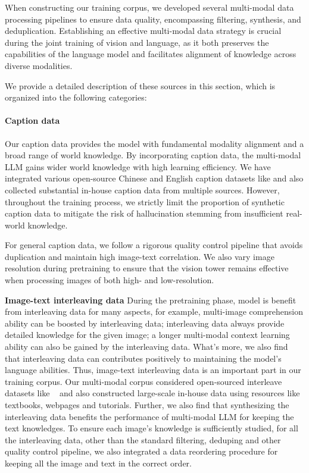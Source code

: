 \documentclass{article}
\newcommand{\citep}[1]{\parencite{#1}}
\begin{document}
When constructing our training corpus, we developed several multi-modal data processing pipelines to ensure data quality, encompassing filtering, synthesis, and deduplication. 
Establishing an effective multi-modal data strategy is crucial during the joint training of vision and language, as it both preserves the capabilities of the language model and facilitates alignment of knowledge across diverse modalities.

We provide a detailed description of these sources in this section, which is organized into the following categories:

\paragraph{Caption data}
Our caption data provides the model with fundamental modality alignment and a broad range of world knowledge. By incorporating caption data, the multi-modal LLM gains wider world knowledge with high learning efficiency. We have integrated various open-source Chinese and English caption datasets like \citep{schuhmann2022laion, gadre2024datacomp} and also collected substantial in-house caption data from multiple sources. However, throughout the training process, we strictly limit the proportion of synthetic caption data to mitigate the risk of hallucination stemming from insufficient real-world knowledge.

For general caption data, we follow a rigorous quality control pipeline that avoids duplication and maintain high image-text correlation. We also vary image resolution during pretraining to ensure that the vision tower remains effective when processing images of both high- and low-resolution.

\textbf{Image-text interleaving data}
During the pretraining phase, model is benefit from interleaving data for many aspects, for example, multi-image comprehension ability can be boosted by interleaving data; interleaving data always provide detailed knowledge for the given image; a longer multi-modal context learning ability can also be gained by the interleaving data. What's more, we also find that interleaving data can contributes positively to maintaining the model’s language abilities. 
Thus, image-text interleaving data is an important part in our training corpus. 
Our multi-modal corpus considered open-sourced interleave datasets like ~\citep{zhu2024multimodal,laurenccon2024obelics} and also constructed large-scale in-house data using resources like textbooks, webpages and tutorials.
Further, we also find that synthesizing the interleaving data benefits the performance of multi-modal LLM for keeping the text knowledges.  
To ensure each image's knowledge is sufficiently studied, for all the interleaving data, other than the standard filtering, deduping and other quality control pipeline, we also integrated a data reordering procedure for keeping all the image and text in the correct order.  
 
\end{document}
